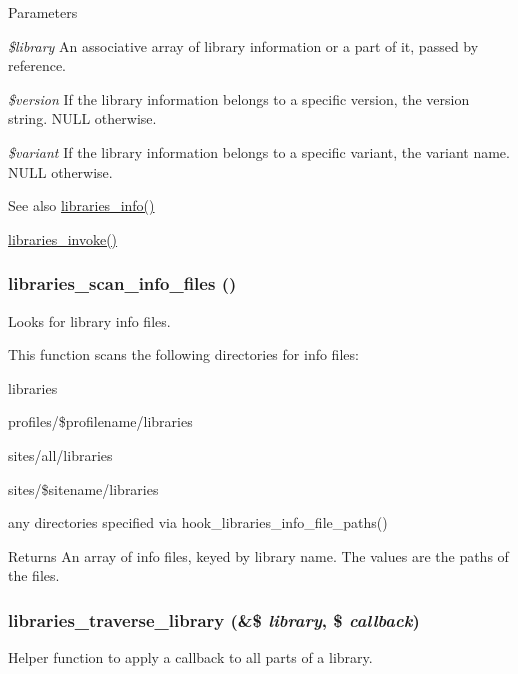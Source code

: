 \begin{DoxyParams}{Parameters}
\item[{\em \$library}]An associative array of library information or a part of it, passed by reference. \item[{\em \$version}]If the library information belongs to a specific version, the version string. NULL otherwise. \item[{\em \$variant}]If the library information belongs to a specific variant, the variant name. NULL otherwise.\end{DoxyParams}
\begin{DoxySeeAlso}{See also}
\hyperlink{libraries_8module_ae592b03bbea251cc7c008cd5ed10c861}{libraries\_\-info()} 

\hyperlink{libraries_8module_a3ac265c084e45903a8b9c4677d534f5b}{libraries\_\-invoke()} 
\end{DoxySeeAlso}
\hypertarget{libraries_8module_a86cb3d1204efd916b9bd09c472457f47}{
\subsubsection[{libraries\_\-scan\_\-info\_\-files}]{\setlength{\rightskip}{0pt plus 5cm}libraries\_\-scan\_\-info\_\-files ()}}
\label{libraries_8module_a86cb3d1204efd916b9bd09c472457f47}
Looks for library info files.

This function scans the following directories for info files:
\begin{DoxyItemize}
\item libraries
\item profiles/\$profilename/libraries
\item sites/all/libraries
\item sites/\$sitename/libraries
\item any directories specified via hook\_\-libraries\_\-info\_\-file\_\-paths()
\end{DoxyItemize}

\begin{DoxyReturn}{Returns}
An array of info files, keyed by library name. The values are the paths of the files. 
\end{DoxyReturn}
\hypertarget{libraries_8module_a2a884881a93bb93aaf11e3b42d38026a}{
\subsubsection[{libraries\_\-traverse\_\-library}]{\setlength{\rightskip}{0pt plus 5cm}libraries\_\-traverse\_\-library (\&\$ {\em library}, \/  \$ {\em callback})}}
\label{libraries_8module_a2a884881a93bb93aaf11e3b42d38026a}
Helper function to apply a callback to all parts of a library.

